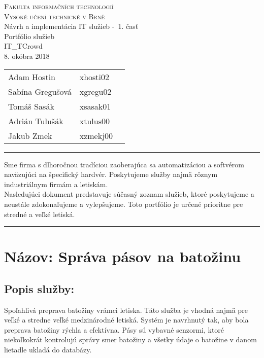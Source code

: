 \documentclass[a4paper, 11pt]{article}
\begin{document}
\begin{center}
\Huge
\textsc{Fakulta informačních technologií\\
Vysoké učení technické v Brně}
\\[84mm]
\LARGE Návrh a implementácia IT služieb \--\ 1. časť\\
\Huge Portfólio služieb\\
\vspace{3.5cm}
\LARGE IT\_TCrowd\\
\Large 8. okóbra 2018
\end{center}

\hfill

\begin{minipage}[l]{0.6 \textwidth}
\Large
\begin{tabular}{l l l}
Adam Hostin  & xhosti02\\
Sabína Gregušová & xgregu02\\
Tomáš Sasák & xsasak01 \\
Adrián Tulušák  & xtulus00 \\
Jakub Zmek & xzmekj00 \\
\end{tabular}
\end{minipage}
\thispagestyle{empty}
\clearpage

\setcounter{page}{1}
\noindent\rule{\textwidth}{1pt}
\begin{center}
Sme firma s dlhoročnou tradíciou zaoberajúca sa automatizáciou a softvérom naväzujúci na špecifický hardvér. Poskytujeme služby najmä rôznym industriálnym firmám a letiskám.  \\

Nasledujúci dokument predstavuje súčasný zoznam služieb, ktoré poskytujeme a neustále zdokonaľujeme a vylepšujeme. Toto portfólio je určené prioritne pre stredné a veľké letiská.\\
\end{center}
\noindent\rule{\textwidth}{1pt}


\section*{Názov: Správa pásov na batožinu}
\subsection*{Popis služby:}
Spoľahlivá preprava batožiny vrámci letiska. Táto služba je vhodná najmä pre veľké a stredne veľké medzinárodné letiská. Systém je navrhnutý tak, aby bola preprava batožiny rýchla a efektívna. Pásy sú vybavné senzormi, ktoré niekoľkokrát kontrolujú správy smer batožiny a všetky údaje o batožine v danom lietadle ukladá do databázy.
\end{document}
